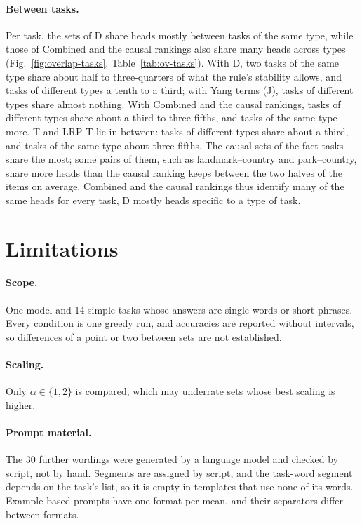 \documentclass[10pt,a4paper]{article}
\begin{document}
\paragraph{Between tasks.} Per task, the sets of D share heads mostly between tasks of the same type, while those of Combined and the causal rankings also share many heads across types (Fig.~\ref{fig:overlap-tasks}, Table~\ref{tab:ov-tasks}). With D, two tasks of the same type share about half to three-quarters of what the rule's stability allows, and tasks of different types a tenth to a third; with Yang terms (J), tasks of different types share almost nothing. With Combined and the causal rankings, tasks of different types share about a third to three-fifths, and tasks of the same type more. T and LRP-T lie in between: tasks of different types share about a third, and tasks of the same type about three-fifths. The causal sets of the fact tasks share the most; some pairs of them, such as landmark--country and park--country, share more heads than the causal ranking keeps between the two halves of the items on average. Combined and the causal rankings thus identify many of the same heads for every task, D mostly heads specific to a type of task.

\section{Limitations}\label{sec:limitations}

\paragraph{Scope.} One model and 14 simple tasks whose answers are single words or short phrases. Every condition is one greedy run, and accuracies are reported without intervals, so differences of a point or two between sets are not established.

\paragraph{Scaling.} Only $\alpha\in\{1,2\}$ is compared, which may underrate sets whose best scaling is higher.

\paragraph{Prompt material.} The 30 further wordings were generated by a language model and checked by script, not by hand. Segments are assigned by script, and the task-word segment depends on the task's list, so it is empty in templates that use none of its words. Example-based prompts have one format per mean, and their separators differ between formats.
\end{document}
